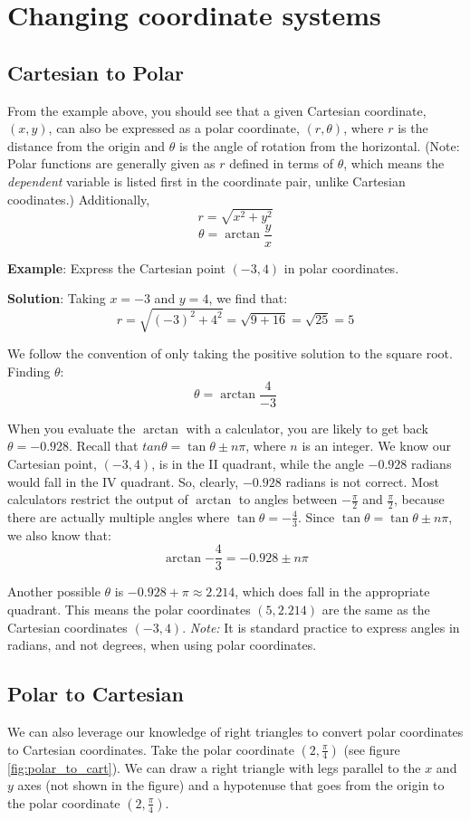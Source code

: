 \section{Changing coordinate systems}

\subsection{Cartesian to Polar}
From the example above, you should see that a given Cartesian coordinate, 
$(x,y)$, can also be expressed as a polar coordinate, $(r, \theta)$, where $r$ 
is the distance from the origin and $\theta$ is the angle of rotation from the 
horizontal. (Note: Polar functions are generally given as $r$ defined in terms 
of $\theta$, which means the \textit{dependent} variable is listed first in 
the coordinate pair, unlike Cartesian coodinates.) Additionally, 
$$r = \sqrt{x^2 + y^2}$$
$$\theta = \arctan{\frac{y}{x}}$$

\textbf{Example}: Express the Cartesian point $(-3, 4)$ in polar coordinates. 

\textbf{Solution}: Taking $x = -3$ and $y = 4$, we find that:
$$r = \sqrt{(-3)^2 + 4^2} = \sqrt{9 + 16} = \sqrt{25} = 5$$

We follow the convention of only taking the positive solution to the square 
root. Finding $\theta$:
$$\theta = \arctan{\frac{4}{-3}}$$

When you evaluate the $\arctan$ with a calculator, you are likely to get back 
$\theta = -0.928$. Recall that $tan{\theta} = \tan{\theta \pm n\pi}$, where $n$ 
is an integer. We know our Cartesian point, $(-3, 4)$, is in the II quadrant, 
while the angle $-0.928$ radians would fall in the IV quadrant. So, clearly, 
$-0.928$ radians is not correct. Most calculators restrict the output of 
$\arctan$ to angles between $-\frac{\pi}{2}$ and $\frac{\pi}{2}$, because 
there are actually multiple angles where $\tan{\theta} = -\frac{4}{3}$. Since 
$\tan{\theta} = \tan{\theta \pm n \pi}$, we also know that:
$$\arctan{-\frac{4}{3}} = -0.928 \pm n \pi$$

Another possible $\theta$ is $-0.928 + \pi \approx 2.214$, which does fall 
in the appropriate quadrant. This means the polar coordinates $(5, 2.214)$ are the 
same as the Cartesian coordinates $(-3, 4)$. \textit{Note:} It is standard 
practice to express angles in radians, and not degrees, when using polar 
coordinates. 

\subsection{Polar to Cartesian}
We can also leverage our knowledge of right triangles to convert polar 
coordinates to Cartesian coordinates. Take the polar coordinate $(2, 
\frac{\pi}{4})$ (see figure \ref{fig:polar_to_cart}). We can draw a right 
triangle with legs parallel to the $x$ and $y$ axes (not shown in the figure) 
and a hypotenuse that goes from the origin to the polar coordinate $(2, \frac{
\pi}{4})$. 

